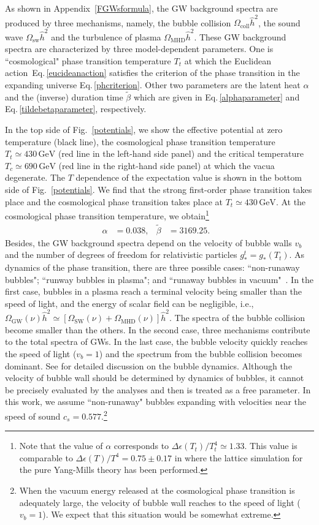 \documentclass[a4paper,preprint,superscriptaddress,preprintnumbers,nofootinbib]{revtex4}
\newcommand{\al}[1]{\begin{align}#1\end{align}}
\newcommand{\fn}[1]{\!\left(#1\right)}
\begin{document}
As shown in Appendix~\ref{FGWsformula}, the GW background spectra are produced by three mechanisms, namely, the bubble collision $\Omega_\text{coll}{\hat h}^2$, the sound wave $\Omega_\text{sw}{\hat h}^2$ and the turbulence of plasma $\Omega_\text{MHD}{\hat h}^2$.
These GW background spectra are characterized by three model-dependent parameters.
One is ``cosmological" phase transition temperature $T_t$ at which the Euclidean action~Eq.\,\eqref{eucideanaction} satisfies the criterion of the phase transition in the expanding universe Eq.\,\eqref{phcriterion}.
Other two parameters are the latent heat $\alpha$ and the (inverse) duration time $\tilde \beta$ which are given in Eq.\,\eqref{alphaparameter} and Eq.\,\eqref{tildebetaparameter}, respectively.


In the top side of Fig.~\ref{potentials}, we show the effective potential at zero temperature (black line), the cosmological phase transition temperature $T_t\simeq 430\,\text{GeV}$ (red line in the left-hand side panel) and  the critical temperature $T_c\simeq 690\,\text{GeV}$ (red line in the right-hand side panel) at which the vacua degenerate.
The $T$ dependence of the expectation value is shown in the bottom side of Fig.~\ref{potentials}.
We find that the strong first-order phase transition takes place and the cosmological phase transition takes place at $T_t\simeq 430\,\text{GeV}$.
At the cosmological phase transition temperature, we obtain\footnote{
Note that the value of $\alpha$ corresponds to $\Delta\epsilon\fn{T_t}/T_t^4\simeq 1.33$.
This value is comparable to $\Delta\epsilon\fn{T}/T^4=0.75\pm 0.17$ in \cite{Shirogane:2016zbf} where the lattice simulation for the pure Yang-Mills theory has been performed.
}
\al{
\alpha&=0.038,&
\tilde \beta&=3169.25.&
\label{latenduration}
}
Besides, the GW background spectra depend on the velocity of bubble walls $v_b$ and the number of degrees of freedom for relativistic particles $g_*^t=g_*\fn{T_t}$.
As dynamics of the phase transition, there are three possible cases: ``non-runaway bubbles"; ``runway bubbles in plasma"; and ``runaway bubbles in vacuum"~\cite{Caprini:2015zlo}.
In the first case, bubbles in a plasma reach a terminal velocity being smaller than the speed of light, and the energy of scalar field can be negligible, i.e., $\Omega_\text{GW}\fn{\nu} {\hat h}^2\simeq \left[\Omega_\text{SW}\fn{\nu}  + \Omega_\text{MHD}\fn{\nu} \right] {\hat h}^2$.
The spectra of the bubble collision become smaller than the others.
In the second case, three mechanisms contribute to the total spectra of GWs.
In the last case, the bubble velocity quickly reaches the speed of light ($v_b=1$) and the spectrum from the bubble collision becomes dominant.
See \cite{Caprini:2015zlo} for detailed discussion on the bubble dynamics.
Although the velocity of bubble wall should be determined by dynamics of bubbles, it cannot be precisely evaluated by the analyses and then is treated as a free parameter.
In this work, we assume ``non-runaway" bubbles expanding with velocities near the speed of sound $c_s=0.577$.\footnote{
When the vacuum energy released at the cosmological phase transition is adequately large, the velocity of bubble wall reaches to the speed of light ($v_b=1$).
We expect that this situation would be somewhat extreme.
}
\end{document}
